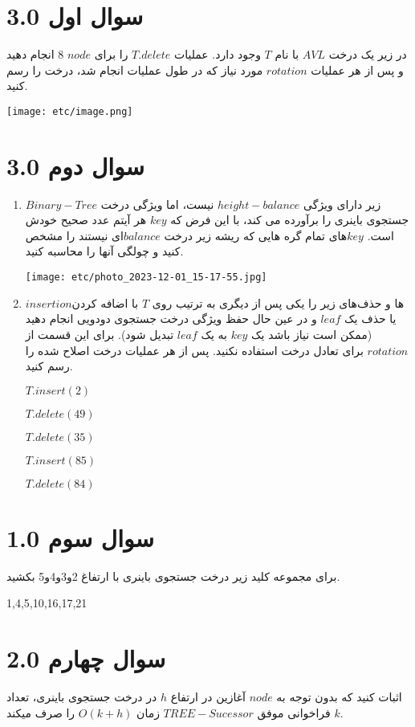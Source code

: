 \documentclass[12pt]{article}
\begin{document}
\fontsize{12pt}{14pt}\selectfont



\section{سوال اول 3.0}
در زیر یک درخت $AVL$ با نام $T$ وجود دارد. عملیات $T.delete$ را برای $node$ 8 انجام دهید و پس از هر عملیات $rotation$ مورد نیاز که در طول عملیات انجام شد، درخت را رسم کنید.

\texttt{[image: etc/image.png]}

\section{سوال دوم 3.0}
\begin{enumerate}
    \item $Binary-Tree$ زیر دارای ویژگی $height-balance$ نیست، اما ویژگی درخت جستجوی باینری را برآورده می کند، با این فرض که $key$ هر آیتم عدد صحیح خودش است. $key$های تمام گره هایی که ریشه زیر درخت $balance$ای نیستند را مشخص کنید و چولگی آنها را محاسبه کنید.
    
    \texttt{[image: etc/photo\_2023-12-01\_15-17-55.jpg]}

    \item $insertion$ها و حذف‌های زیر را یکی پس از دیگری به ترتیب روی $T$ با اضافه کردن یا حذف یک $leaf$ و در عین حال حفظ ویژگی درخت جستجوی دودویی انجام دهید (ممکن است نیاز باشد یک $key$ به یک $leaf$ تبدیل شود).
    برای این قسمت از $rotation$ برای تعادل درخت استفاده نکنید. پس از هر عملیات درخت اصلاح شده را رسم کنید.
    
    $T.insert(2)$
    
    $T.delete(49)$
    
    $T.delete(35)$
    
    $T.insert(85)$
    
    $T.delete(84)$
\end{enumerate}


\section{سوال سوم 1.0}
برای مجموعه کلید زیر درخت جستجوی باینری با ارتفاغ 2و3و4و5 بکشید.

{1,4,5,10,16,17,21}



\section{سوال چهارم 2.0}
اثبات کنید که بدون توجه به $node$ آغازین در ارتفاع $h$ در درخت جستجوی باینری، تعداد $k$ فراخوانی موفق $TREE-Sucessor$ زمان $O(k+h)$ را صرف میکند.
\end{document}
